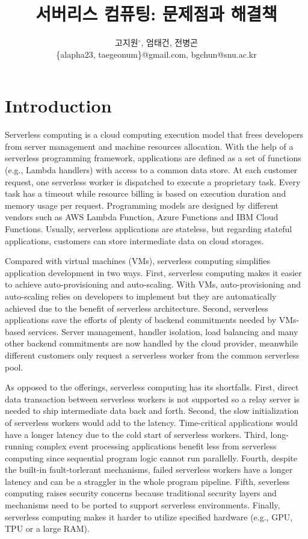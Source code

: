 \documentclass{kcc}
\title{서버리스 컴퓨팅: 문제점과 해결책}
\author{
고지원$^{\circ}$, 엄태건, 전병곤\\
\{alapha23, taegeonum\}@gmail.com, bgchun@snu.ac.kr
}
\begin{document}
\maketitle

\section{Introduction}

Serverless computing is a cloud computing execution model that frees developers from server management and machine resources allocation. With the help of a serverless programming framework, applications are defined as a set of functions (e.g., Lambda handlers) with access to a common data store. 
At each customer request, one serverless worker is dispatched to execute a proprietary task. Every task has a timeout while resource billing is based on execution duration and memory usage per request. Programming models are designed by different vendors such as AWS Lambda Function, Azure Functions and IBM Cloud Functions. Usually, serverless applications are stateless, but regarding stateful applications, customers can store intermediate data on cloud storages.

Compared with virtual machines (VMs), serverless computing simplifies application development in two ways.
First, serverless computing makes it easier to achieve auto-provisioning and auto-scaling. With VMs, auto-provisioning and auto-scaling relies on developers to implement but they are automatically achieved due to the benefit of serverless architecture. Second, serverless applications save the efforts of plenty of backend commitments needed by VMs-based services. Server management, handler isolation, load balancing and many other backend commitments are now handled by the cloud provider, meanwhile different customers only request a serverless worker from the common serverless pool.

As opposed to the offerings, serverless computing has its shortfalls. 
First, direct data transaction between serverless workers is not supported so a relay server is needed to ship intermediate data back and forth. 
Second, the slow initialization of serverless workers would add to the latency. Time-critical applications would have a longer latency due to the cold start of serverless workers.
Third, long-running complex event processing applications benefit less from serverless computing since sequential program logic cannot run parallelly. 
Fourth, despite the built-in fault-torlerant mechanisms, failed serverless workers have a longer latency and can be a straggler in the whole program pipeline. 
Fifth, severless computing raises security concerns because traditional security layers and mechanisms need to be ported to support serverless environments. 
Finally, serverless computing makes it harder to utilize specified hardware (e.g., GPU, TPU or a large RAM).
\end{document}
